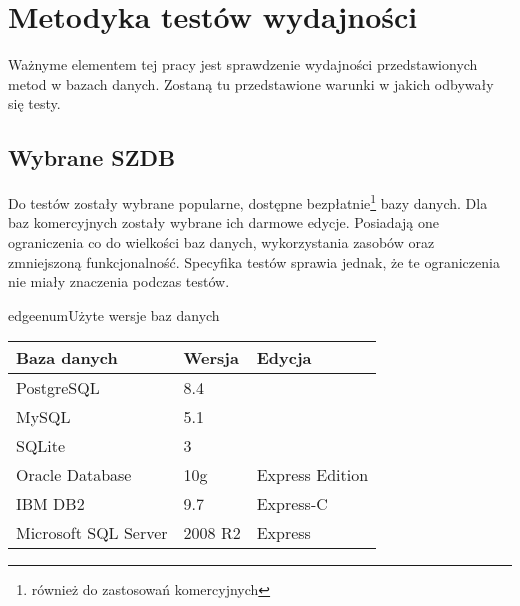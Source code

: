 \chapter{Metodyka testów wydajności}

Ważnyme elementem tej pracy jest sprawdzenie wydajności przedstawionych metod w bazach danych.
Zostaną tu przedstawione warunki w jakich odbywały się testy.

\section{Wybrane SZDB}

Do testów zostały wybrane popularne, dostępne bezpłatnie\footnote{również do zastosowań komercyjnych} bazy danych. 
Dla baz komercyjnych zostały wybrane ich darmowe edycje. 
Posiadają one ograniczenia co do wielkości baz danych, wykorzystania zasobów oraz zmniejszoną funkcjonalność. 
Specyfika testów sprawia jednak, że te ograniczenia nie miały znaczenia podczas testów.





\begin{qxtab}{edgeenum}{Użyte wersje baz danych}
\begin{tabular}{l|l|l}
Baza danych                            & Wersja & Edycja \\
\hline
PostgreSQL\index{PostgreSQL}           &  8.4      & \\
MySQL\index{MySQL}                     &  5.1      & \\
SQLite\index{SQLite}                   &  3        & \\
Oracle Database\index{Oracle}          &  10g      & Express Edition \\
IBM DB2\index{IBM DB2}                 &  9.7      & Express-C \\
Microsoft SQL Server\index{SQL Server} &  2008 R2  & Express\\
\end{tabular} 
\end{qxtab}

